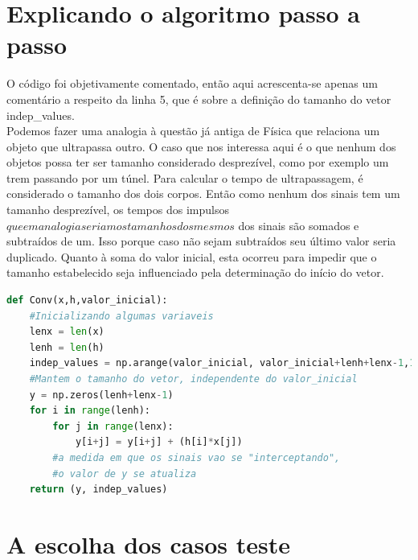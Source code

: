 \documentclass[dvipdfm, a4paper, 11pt]{report}
\begin{document}
{\section{Explicando o algoritmo passo a passo}
O código foi objetivamente comentado, então aqui acrescenta-se apenas um comentário a respeito da linha 5, que é sobre a definição do tamanho do vetor indep\_values.\\
Podemos fazer uma analogia à questão já antiga de Física que relaciona um objeto que ultrapassa outro. O caso que nos interessa aqui é o que nenhum dos objetos possa ter ser tamanho considerado desprezível, como por exemplo um trem passando por um túnel. Para calcular o tempo de ultrapassagem, é considerado o tamanho dos dois corpos. Então como nenhum dos sinais tem um tamanho desprezível, os tempos dos impulsos\(que em analogia seriam os tamanhos dos mesmos\) dos sinais são somados e subtraídos de um. Isso porque caso não sejam subtraídos seu último valor seria duplicado. Quanto à soma do valor inicial, esta ocorreu para impedir que o tamanho estabelecido seja influenciado pela determinação do início do vetor.
\small{
\begin{lstlisting}[language = python]
def Conv(x,h,valor_inicial):
	#Inicializando algumas variaveis
	lenx = len(x)
	lenh = len(h)
	indep_values = np.arange(valor_inicial, valor_inicial+lenh+lenx-1,1)
	#Mantem o tamanho do vetor, independente do valor_inicial
	y = np.zeros(lenh+lenx-1)
	for i in range(lenh):
		for j in range(lenx):
			y[i+j] = y[i+j] + (h[i]*x[j]) 
		#a medida em que os sinais vao se "interceptando", 
		#o valor de y se atualiza
	return (y, indep_values)
\end{lstlisting}
}
\newpage
\section{A escolha dos casos teste}

}
\end{document}

